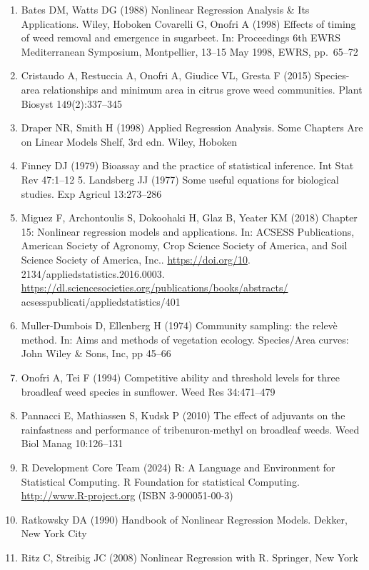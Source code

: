 \documentclass[
  12pt,
]{book}
\providecommand{\tightlist}{%
  \setlength{\itemsep}{0pt}\setlength{\parskip}{0pt}}
\begin{document}
\begin{enumerate}
\def\labelenumi{\arabic{enumi}.}
\tightlist
\item
  Bates DM, Watts DG (1988) Nonlinear Regression Analysis \& Its Applications. Wiley, Hoboken Covarelli G, Onofri A (1998) Effects of timing of weed removal and emergence in sugarbeet. In: Proceedings 6th EWRS Mediterranean Symposium, Montpellier, 13--15 May 1998, EWRS, pp.~65--72
\item
  Cristaudo A, Restuccia A, Onofri A, Giudice VL, Gresta F (2015) Species-area relationships and minimum area in citrus grove weed communities. Plant Biosyst 149(2):337--345
\item
  Draper NR, Smith H (1998) Applied Regression Analysis. Some Chapters Are on Linear Models
  Shelf, 3rd edn. Wiley, Hoboken
\item
  Finney DJ (1979) Bioassay and the practice of statistical inference. Int Stat Rev 47:1--12 5. Landsberg JJ (1977) Some useful equations for biological studies. Exp Agricul 13:273--286
\item
  Miguez F, Archontoulis S, Dokoohaki H, Glaz B, Yeater KM (2018) Chapter 15: Nonlinear regression models and applications. In: ACSESS Publications, American Society of Agronomy, Crop Science Society of America, and Soil Science Society of America, Inc.. \url{https://doi.org/10}. 2134/appliedstatistics.2016.0003. \url{https://dl.sciencesocieties.org/publications/books/abstracts/} acsesspublicati/appliedstatistics/401
\item
  Muller-Dumbois D, Ellenberg H (1974) Community sampling: the relevè method. In: Aims and methods of vegetation ecology. Species/Area curves: John Wiley \& Sons, Inc, pp 45--66
\item
  Onofri A, Tei F (1994) Competitive ability and threshold levels for three broadleaf weed species in sunflower. Weed Res 34:471--479
\item
  Pannacci E, Mathiassen S, Kudsk P (2010) The effect of adjuvants on the rainfastness and performance of tribenuron-methyl on broadleaf weeds. Weed Biol Manag 10:126--131
\item
  R Development Core Team (2024) R: A Language and Environment for Statistical Computing. R Foundation for statistical Computing. \url{http://www.R-project.org} (ISBN 3-900051-00-3)
\item
  Ratkowsky DA (1990) Handbook of Nonlinear Regression Models. Dekker, New York City
\item
  Ritz C, Streibig JC (2008) Nonlinear Regression with R. Springer, New York

\end{enumerate}
\end{document}

